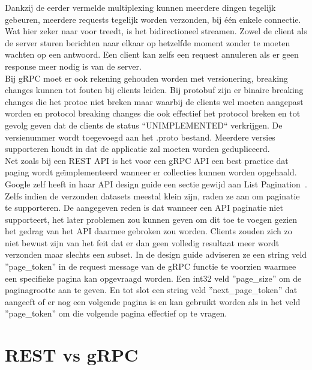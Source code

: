 Dankzij de eerder vermelde multiplexing kunnen meerdere dingen tegelijk gebeuren, meerdere requests tegelijk worden verzonden, bij \'e\'en enkele connectie.
Wat hier zeker naar voor treedt, is het bidirectioneel streamen. Zowel de client als de server sturen berichten naar elkaar op hetzelfde moment zonder te moeten wachten
op een antwoord. Een client kan zelfs een request annuleren als er geen response meer nodig is van de server.\newline
~\autocite{freecodecamp}\\

Bij gRPC moet er ook rekening gehouden worden met versionering, breaking changes kunnen tot fouten bij clients leiden.
Bij protobuf zijn er binaire breaking changes die het protoc niet breken maar waarbij de clients wel moeten aangepast worden en protocol breaking changes
die ook effectief het protocol breken en tot gevolg geven dat de clients de status ``UNIMPLEMENTED`` verkrijgen. De versienummer wordt toegevoegd aan
het .proto bestand. Meerdere versies supporteren houdt in dat de applicatie zal moeten worden gedupliceerd.\\

Net zoals bij een REST API is het voor een gRPC API een best practice dat paging wordt ge\"{\i}mplementeerd wanneer er collecties kunnen worden opgehaald.
Google zelf heeft in haar API design guide een sectie gewijd aan List Pagination~\parencite{googlepaging}. Zelfs indien de verzonden datasets meestal
klein zijn, raden ze aan om paginatie te supporteren. De aangegeven reden is dat wanneer een API paginatie niet supporteert, het later
problemen zou kunnen geven om dit toe te voegen gezien het gedrag van het API daarmee gebroken zou worden. Clients zouden zich zo niet bewust zijn van het feit
dat er dan geen volledig resultaat meer wordt verzonden maar slechts een subset. In de design guide adviseren ze een string veld ''page\_token'' in de request message
van de gRPC functie te voorzien waarmee een specifieke pagina kan opgevraagd worden. Een int32 veld ''page\_size'' om de paginagrootte aan te geven.
En tot slot een string veld ''next\_page\_token'' dat aangeeft of er nog een volgende pagina is en kan gebruikt worden als in het veld ''page\_token''
om die volgende pagina effectief op te vragen.\newline
~\autocite{grpcversion}\\


\section{REST vs gRPC}

